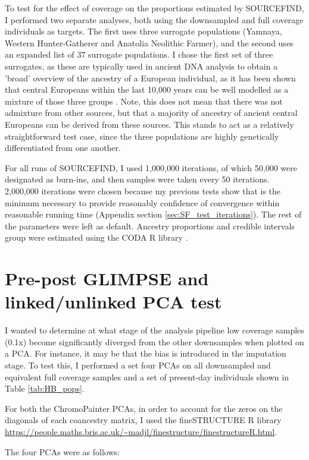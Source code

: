 To test for the effect of coverage on the proportions estimated by SOURCEFIND, I performed two separate analyses, both using the downsampled and full coverage individuals as targets. The first uses three surrogate populations (Yamnaya, Western Hunter-Gatherer and Anatolia Neolithic Farmer), and the second uses an expanded list of 37 surrogate populations. I chose the first set of three surrogates, as these are typically used in ancient DNA analysis to obtain a 'broad' overview of the ancestry of a European individual, as it has been shown that central Europeans within the last 10,000 years can be well modelled as a mixture of those three groups \cite{Lazaridis2014, Haak2015}. Note, this does not mean that there was not admixture from other sources, but that a majority of ancestry of ancient central Europeans can be derived from these sources. This stands to act as a relatively straightforward test case, since the three populations are highly genetically differentiated from one another.

For all runs of SOURCEFIND, I used 1,000,000 iterations, of which 50,000 were designated as burn-ins, and then samples were taken every 50 iterations. 2,000,000 iterations were chosen because my previous tests show that is the minimum necessary to provide reasonably confidence of convergence within reasonable running time (Appendix section \ref{sec:SF_test_iterations}). The rest of the parameters were left as default. Ancestry proportions and credible intervals group were estimated using the CODA R library \cite{oro22547}.

\section{Pre-post GLIMPSE and linked/unlinked PCA test}

I wanted to determine at what stage of the analysis pipeline low coverage samples (0.1x) become significantly diverged from the other downsamples when plotted on a PCA. For instance, it may be that the bias is introduced in the imputation stage. To test this, I performed a set four PCAs on all downsampled and equivalent full coverage samples and a set of present-day individuals shown in Table \ref{tab:HB_pops}.

For both the ChromoPainter PCAs, in order to account for the zeros on the diagonals of each coancestry matrix, I used the fineSTRUCTURE R library \url{https://people.maths.bris.ac.uk/~madjl/finestructure/finestructureR.html}.

The four PCAs were as follows:


